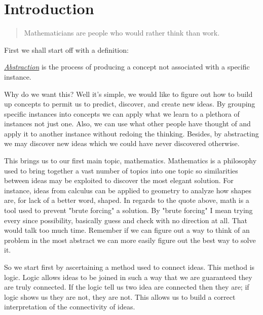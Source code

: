 \chapter{Introduction}
    \begin{quote}
        Mathematicians are people who would rather think than work.\newline
    \end{quote}

    \bigskip

    First we shall start off with a definition:
    \begin{defn}
       \underline{\emph{Abstraction}} is the process of producing a concept not associated with a specific instance.
    \end{defn}
    Why do we want this?
    Well it's simple, we would like to figure out how to build up concepts to permit us to predict, discover, and create new ideas.
    By grouping specific instances into concepts we can apply what we learn to a plethora of instances not just one.
    Also, we can use what other people have thought of and apply it to another instance without redoing the thinking.
    Besides, by abstracting we may discover new ideas which we could have never discovered otherwise.
    
    This brings us to our first main topic, mathematics.
    Mathematics is a philosophy used to bring together a vast number of topics into one topic so similarities between ideas may be exploited to discover the most elegant solution.
    For instance, ideas from calculus can be applied to geometry to analyze how shapes are, for lack of a better word, shaped.
    In regards to the quote above, math is a tool used to prevent "brute forcing" a solution.
    By "brute forcing" I mean trying every since possibility, basically guess and check with no direction at all.
    That would talk too much time.
    Remember if we can figure out a way to think of an problem in the most abstract we can more easily figure out the best way to solve it.

    So we start first by ascertaining a method used to connect ideas.
    This method is logic.
    Logic allows ideas to be joined in such a way that we are guaranteed they are truly connected.
    If the logic tell us two idea are connected then they are; if logic shows us they are not, they are not.
    This allows us to build a correct interpretation of the connectivity of ideas.


